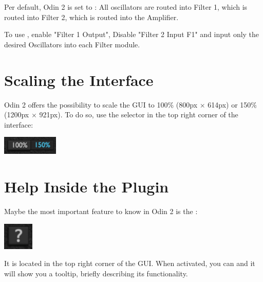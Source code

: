 
\vspace{5mm}
Per default, Odin 2 is set to : All oscillators are routed into Filter 1, which is routed into Filter 2, which is routed into the Amplifier.

To use , enable "Filter 1 Output", Disable "Filter 2 Input F1" and input only the desired Oscillators into each Filter module.

\section{Scaling the Interface}
Odin 2 offers the possibility to scale the GUI to 100\% (800px $\times$ 614px) or 150\% (1200px $\times$ 921px). To do so, use the selector in the top right corner of the interface:
\begin{center}
    \includegraphics[width=0.2\textwidth]{graphics/GUI_scaling.png}
\end{center}

\section{Help Inside the Plugin}
Maybe the most important feature to know in Odin 2 is the :

\begin{center}
    \includegraphics[width=0.11\textwidth]{graphics/tooltip.png}
\end{center}

It is located in the top right corner of the GUI. When activated, you can  and it will show you a tooltip, briefly describing its functionality.

